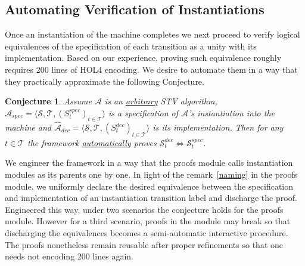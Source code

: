\documentclass[10pt,conference]{IEEEtran}
\newtheorem{conjecture}{Conjecture}
\begin{document}
\subsection{Automating Verification of Instantiations}
Once an instantiation of the machine  completes   
 we next proceed to verify logical equivalences of the specification of each transition as a unity with its  implementation. 
Based on our experience, proving  such equivalence 
roughly requires 200 lines of HOL4 encoding. %
We desire to automate them in a way that they practically approximate the following Conjecture.   
 \begin{conjecture}\label{conj}
 Assume $\mathcal{A}$ is an \underline{arbitrary} STV algorithm, $\hat{\mathcal{A}}_{spec}= \langle \mathcal{S}, \mathcal{T}, (S_{t}^{spec})_{t \in \mathcal{T}} \rangle$ is a specification of $\mathcal{A}$'s instantiation into the machine and $\hat{\mathcal{A}}_{dec}= \langle \mathcal{S}, \mathcal{T}, (S_{t}^{dec})_{t \in \mathcal{T}} \rangle$ is its implementation. 
  Then for any $t\in\mathcal{T}$ the framework \underline{automatically} proves  $\mathcal{S}_{t}^{dec}\Leftrightarrow\mathcal{S}_{t}^{spec}$. 
 \end{conjecture}
We engineer the framework in a way that the proofs module calls instantiation modules as its parents  one by one.
In light of the remark~\ref{naming} in the proofs module,  we uniformly declare the desired equivalence between the specification and implementation of an instantiation transition label and discharge the proof.
Engineered this way, under two scenarios the conjecture holds for the proofs module. However for a third scenario, proofs in the module may break so that discharging the equivalences  becomes a semi-automatic interactive procedure. The proofs nonetheless remain reusable after proper refinements so that one needs not encoding 200 lines again. 
\end{document}
